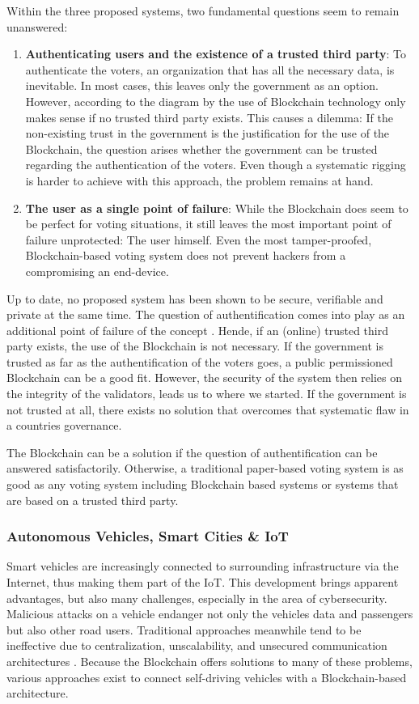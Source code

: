 Within the three proposed systems, two fundamental questions seem to remain unanswered:
\begin{enumerate}
    \item \textbf{Authenticating users and the existence of a trusted third party}: To authenticate the voters, an organization that has all the necessary data, is inevitable. In most cases, this leaves only the government as an option. However, according to the diagram by \cite{Wust2017} the use of Blockchain technology only makes sense if no trusted third party exists. This causes a dilemma: If the non-existing trust in the government is the justification for the use of the Blockchain, the question arises whether the government can be trusted regarding the authentication of the voters. Even though a systematic rigging is harder to achieve with this approach, the problem remains at hand.
    \item \textbf{The user as a single point of failure}: While the Blockchain does seem to be perfect for voting situations, it still leaves the most important point of failure unprotected: The user himself. Even the most tamper-proofed, Blockchain-based voting system does not prevent hackers from a compromising an end-device.
\end{enumerate}

Up to date, no proposed system has been shown to be secure, verifiable and private at the same time. The question of authentification comes into play as an additional point of failure of the concept \cite{Osgood2016}.
Hende, if an (online) trusted third party exists, the use of the Blockchain is not necessary. If the government is trusted as far as the authentification of the voters goes, a public permissioned Blockchain can be a good fit. However, the security of the system then relies on the integrity of the validators,  leads us to where we started. If the government is not trusted at all, there exists no solution that overcomes that systematic flaw in a countries governance.

The Blockchain can be a solution if the question of authentification can be answered satisfactorily. Otherwise, a traditional paper-based voting system is as good as any voting system including Blockchain based systems or systems that are based on a trusted third party.

\subsubsection{Autonomous Vehicles, Smart Cities \& IoT}
Smart vehicles are increasingly connected to surrounding infrastructure via the Internet, thus making them part of the IoT. This development brings apparent advantages, but also many challenges, especially in the area of cybersecurity. Malicious attacks on a vehicle endanger not only the vehicles data and passengers but also other road users. Traditional approaches meanwhile tend to be ineffective due to centralization, unscalability, and unsecured communication architectures \cite{DorriSteger2017}. Because the Blockchain offers solutions to many of these problems, various approaches exist to connect self-driving vehicles with a Blockchain-based architecture.

